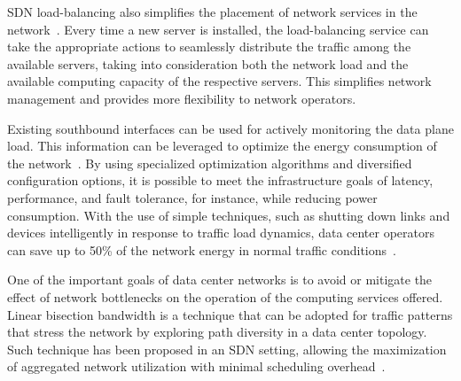 SDN load-balancing also simplifies the placement of network services in the network~\cite{handigol2009-1}.
Every time a new server is installed, the load-balancing service can take the appropriate actions to seamlessly distribute the traffic among the 
available servers, taking into consideration both the network load and the available computing capacity of the respective servers.
This simplifies network management and provides more flexibility to network operators.

Existing southbound interfaces can be used for actively monitoring the data plane load.
This information can be leveraged to optimize the energy consumption of the network~\cite{heller2010}. 
By using specialized optimization algorithms and diversified configuration options, it is possible to meet the 
infrastructure goals of latency, performance, and fault tolerance, for instance, while reducing power consumption.
With the use of simple techniques, such as shutting down links and devices intelligently in response to traffic load dynamics, data center operators can save up to 50\% of the network energy in normal traffic 
conditions~\cite{heller2010}. 

One of the important goals of data center networks is to avoid or mitigate the effect of network bottlenecks on the operation of the computing services offered.
Linear bisection bandwidth is a technique that can be adopted for traffic patterns that stress the network by exploring path diversity in a data center 
topology.
Such technique has been proposed in an SDN setting, allowing the maximization of aggregated network utilization with minimal scheduling overhead~\cite{al-fares2010}. 

